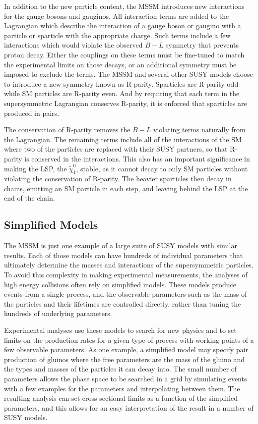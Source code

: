 In addition to the new particle content, the \ac{MSSM} introduces  new interactions for the gauge bosons and gauginos.
All interaction terms are added to the Lagrangian which describe the interaction of a gauge boson or gaugino with a particle or sparticle with the appropriate charge.
Such terms include a few interactions which would violate the observed $B - L$ symmetry that prevents proton decay.
Either the couplings on these terms must be fine-tuned to match the experimental limits on those decays, or an additional symmetry must be imposed to exclude the terms.
The \ac{MSSM} and several other \ac{SUSY} models choose to introduce a new symmetry known as R-parity.
Sparticles are R-parity odd while \ac{SM} particles are R-parity even.
And by requiring that each term in the supersymmetric Lagrangian conserves R-parity, it is enforced that sparticles are produced in pairs.

The conservation of R-parity removes the $B-L$ violating terms naturally from the Lagrangian.
The remaining terms include all of the interactions of the \ac{SM} where two of the particles are replaced with their \ac{SUSY} partners, so that R-parity is conserved in the interactions.
This also has an important significance in making the \ac{LSP}, the $\tilde{\chi}_1^0$, stable, as it cannot decay to only \ac{SM} particles without violating the conservation of R-parity.
The heavier sparticles then decay in chains, emitting an \ac{SM} particle in each step, and leaving behind the \ac{LSP} at the end of the chain.

\subsection{Simplified Models}

The \ac{MSSM} is just one example of a large suite of \ac{SUSY} models with similar results.
Each of those models can have hundreds of individual parameters that ultimately determine the masses and interactions of the supersymmetric particles.
To avoid this complexity in making experimental measurements, the analyses of high energy collisions often rely on simplified models.
These models produce events from a single process, and the observable parameters such as the mass of the particles and their lifetimes are controlled directly, rather than tuning the hundreds of underlying parameters.

Experimental analyses use these models to search for new physics and to set limits on the production rates for a given type of process with working points of a few observable parameters.
As one example, a simplified model may specify pair production of gluinos where the free parameters are the mass of the gluino and the types and masses of the particles it can decay into.
The small number of parameters allows the phase space to be searched in a grid by simulating events with a few examples for the parameters and interpolating between them.
The resulting analysis can set cross sectional limits as a function of the simplified parameters, and this allows for an easy interpretation of the result in a number of \ac{SUSY} models.

